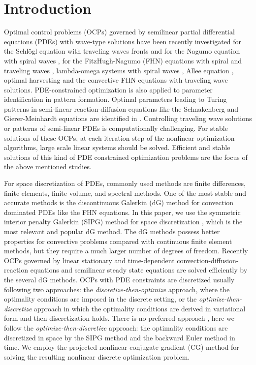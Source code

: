 \documentclass[preprint,12pt]{elsarticle}
\begin{document}
\section{Introduction}
\label{introduction}

Optimal control problems (OCPs) governed by semilinear partial differential equations (PDEs) with wave-type solutions  have been recently investigated for the Schl\"ogl equation with traveling waves fronts  and for the Nagumo equation with spiral waves \cite{buchholz13ocs}, for the  FitzHugh-Nagumo (FHN) equations with spiral and traveling waves \cite{Casas13,Casas15soasa,Ryll16}, lambda-omega systems with spiral waves \cite{borzi06doc}, Allee equation \cite{Trelat18}, optimal harvesting \cite{Yilmaz17} and  the convective FHN equations \cite{Uzunca17} with traveling wave solutions. PDE-constrained optimization is also applied to parameter identification in pattern formation. Optimal parameters leading to Turing patterns in semi-linear reaction-diffusion equations like the Schnakenberg and Gierer-Meinhardt equations are identified in \cite{Garvie10,Garvie14,Stoll16}. Controlling traveling wave solutions or patterns of semi-linear PDEs is computationally  challenging. For stable solutions of these OCPs, at each iteration step of the nonlinear optimization algorithms, large scale linear systems should be solved. Efficient and stable solutions of this kind of PDE constrained optimization problems are the focus of the above mentioned studies.


For space discretization of PDEs, commonly used methods are finite differences, finite elements, finite volume, and spectral methods.  One of the most stable and accurate methods is the discontinuous Galerkin (dG) method for convection dominated PDEs like the FHN equations.  In this paper, we use the symmetric interior penalty Galerkin (SIPG) method for space discretization \cite{Arnold02,riviere08dgm}, which is the most relevant and popular dG method. The dG methods possess better properties for convective problems compared with continuous finite element methods, but they require a much larger number of degrees of freedom. Recently OCPs governed by linear stationary and time-dependent convection-diffusion-reaction equations \cite{Akman14,Akman14a,Yucel14} and semilinear steady state equations \cite{Yucel15dgm} are solved efficiently by the several dG methods. OCPs with PDE constraints are discretized usually following two approaches: the {\em discretize-then-optimize\/} approach, where the optimality conditions are imposed in the discrete setting, or  the {\em optimize-then-discretize} approach in which the optimality conditions are derived in variational form and then discretization holds.  There is no preferred approach  \cite{Benner14tip,Gubisch17}, here we follow the {\em optimize-then-discretize} approach: the optimality conditions are discretized in space by the SIPG method and the backward Euler method in time. We employ the projected nonlinear conjugate gradient (CG) method  \cite{Hager06acgd} for solving the resulting nonlinear discrete optimization problem.
\end{document}
